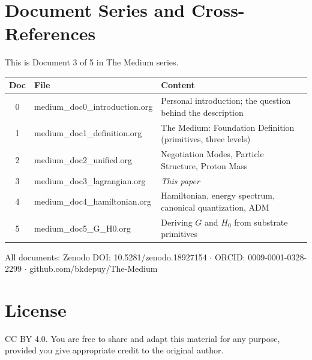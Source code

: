 \documentclass[11pt,letterpaper]{article}
\begin{document}
\section{Document Series and Cross-References}
\label{sec:org78e6a18}

This is Document 3 of 5 in The Medium series.

\begin{center}
\begin{tabular}{clp{9cm}}
\toprule
\textbf{Doc} & \textbf{File} & \textbf{Content}\\[0pt]
\midrule
0 & medium\_doc0\_introduction.org & Personal introduction; the question behind the description\\[0pt]
1 & medium\_doc1\_definition.org & The Medium: Foundation Definition (primitives, three levels)\\[0pt]
2 & medium\_doc2\_unified.org & Negotiation Modes, Particle Structure, Proton Mass\\[0pt]
3 & medium\_doc3\_lagrangian.org & \emph{This paper}\\[0pt]
4 & medium\_doc4\_hamiltonian.org & Hamiltonian, energy spectrum, canonical quantization, ADM\\[0pt]
5 & medium\_doc5\_G\_H0.org & Deriving \(G\) and \(H_0\) from substrate primitives\\[0pt]
\bottomrule
\end{tabular}
\end{center}

All documents: Zenodo DOI: 10.5281/zenodo.18927154 \(\cdot\) ORCID: 0009-0001-0328-2299 \(\cdot\) github.com/bkdepuy/The-Medium

\section{License}
\label{sec:org2734b14}

CC BY 4.0. You are free to share and adapt this material for any purpose, provided you give appropriate credit to the original author.
\end{document}
